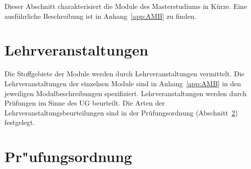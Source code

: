 Dieser Abschnitt charakterisiert die Module des Masterstudiums
\emph{} in Kürze. Eine ausführliche Beschreibung ist in
Anhang~\ref{app:AMB} zu finden.

%

\section{Lehrveranstaltungen}\label{sec:LVS}

Die Stoffgebiete der Module werden durch Lehrveranstaltungen
vermittelt.  Die Lehrveranstaltungen der einzelnen Module sind in
Anhang~\ref{app:AMB} in den jeweiligen Modulbeschreibungen
spezifiziert.  Lehrveranstaltungen werden durch Prüfungen im Sinne des
UG beurteilt.  Die Arten der Lehrveranstaltungsbeurteilungen sind in
der Prüfungsordnung (Abschnitt~\ref{sec:PO}) festgelegt.

\section{Pr"ufungsordnung}\label{sec:PO}

